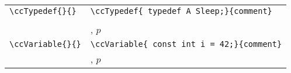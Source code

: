 \begin{supertabular}{|p{7.4cm}|p{7.4cm}|}
\verb|\ccTypedef{|\verb|}{|\verb|}|
&\verb+\ccTypedef{ typedef A Sleep;}{comment}+ \\
& \\
&, $p$
\\ \hline

\verb|\ccVariable{|\verb|}{|\verb|}|
&\verb+\ccVariable{ const int i = 42;}{comment}+ \\
&, $p$ 
\\ \hline
\end{supertabular}
